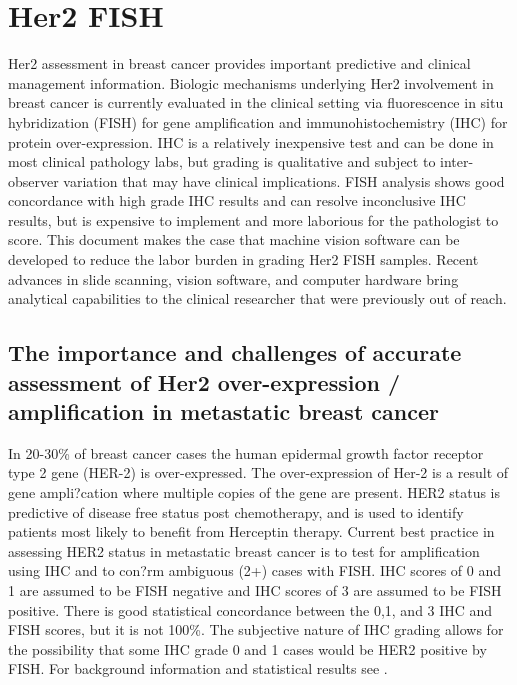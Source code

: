 \section{Her2 FISH}
Her2 assessment in breast cancer provides important predictive and clinical management information. Biologic mechanisms underlying Her2 involvement in breast cancer is currently evaluated in the clinical setting via fluorescence in situ hybridization (FISH) for gene amplification and immunohistochemistry (IHC) for protein over-expression. IHC is a relatively inexpensive test and can be done in most clinical pathology labs, but grading is qualitative and subject to inter-observer variation that may have clinical implications. FISH analysis shows good concordance with high grade IHC results and can resolve inconclusive IHC results, but is expensive to implement and more laborious for the pathologist to score. This document makes the case that machine vision software can be developed to reduce the labor burden in grading Her2 FISH samples. Recent advances in slide scanning, vision software, and computer hardware bring analytical capabilities to the clinical researcher that were previously out of reach.
\subsection{The importance and challenges of accurate assessment of Her2 over-expression / amplification in metastatic breast cancer}
In 20-30\% of breast cancer cases the human epidermal growth factor receptor type 2 gene (HER-2) is over-expressed. The over-expression of Her-2 is a result of gene ampli?cation where multiple copies of the gene are present. HER2 status is predictive of disease free status post chemotherapy, and is used to identify patients most likely to benefit from Herceptin therapy. Current best practice in assessing HER2 status in metastatic breast cancer is to test for amplification using IHC and to con?rm ambiguous (2+) cases with FISH. IHC scores of 0 and 1 are assumed to be FISH negative and IHC scores of 3 are assumed to be FISH positive. There is good statistical concordance between the 0,1, and 3 IHC and FISH scores, but it is not 100\%. The subjective nature of IHC grading allows for the possibility that some IHC grade 0 and 1 cases would be HER2 positive by FISH. For background information and statistical results see  \cite{HER2FISH1} \cite{HER2FISH3} \cite{HER2FISH4} \cite{HER2FISH5} \cite{HER2FISH6} \cite{HER2FISH7} \cite{HER2FISH8}.
